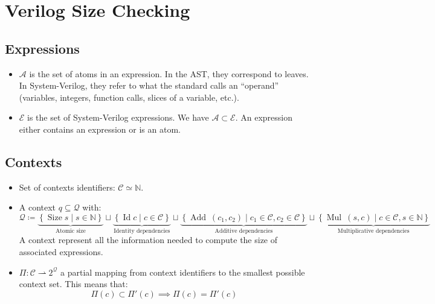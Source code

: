 \documentclass{article}
\DeclareMathOperator{\Size}{Size}
\DeclareMathOperator{\Add}{Add}
\DeclareMathOperator{\Id}{Id}
\DeclareMathOperator{\Mul}{Mul}
\begin{document}
\section*{Verilog Size Checking}


\subsection*{Expressions}

\begin{itemize}
    \item $\mathcal{A}$ is the set of atoms in an expression. In the AST, they correspond to leaves. In System-Verilog, they refer to what the standard calls an ``operand'' (variables, integers, function calls, slices of a variable, etc.).
    \item $\mathcal{E}$ is the set of System-Verilog expressions. We have $\mathcal{A} \subset \mathcal{E}$. An expression either contains an expression or is an atom.
\end{itemize}

\subsection*{Contexts}
\begin{itemize}
    \item Set of contexts identifiers: $\mathcal{C} \simeq \mathbb{N}$.
    \item A context $q \subseteq \mathcal{Q}$ with:
          \begin{equation*}
              \mathcal{Q} \coloneq
              \underbrace{\left\{\Size s \mid s \in \mathbb{N}\right\}}_{\text{Atomic size}}
              \sqcup
              \underbrace{\left\{\Id c \mid c \in \mathcal{C}\right\}}_{\text{Identity dependencies}}
              \sqcup
              \underbrace{\left\{\Add~(c_1, c_2) \mid c_1 \in \mathcal{C}, c_2 \in \mathcal{C}\right\}}_{\text{Additive dependencies}}
              \sqcup
              \underbrace{\left\{\Mul~(s, c) \mid c \in \mathcal{C}, s \in \mathbb{N}\right\}}_{\text{Multiplicative dependencies}}
          \end{equation*}
          A context represent all the information needed to compute the size of associated expressions.

    \item $\Pi: \mathcal{C} \rightharpoonup  2^{\mathcal{Q}}$ a partial mapping from context identifiers to
          the smallest possible context set. This means that:
          \begin{equation*}
              \Pi(c) \subset \Pi'(c) \implies \Pi(c) = \Pi'(c)
          \end{equation*}
\end{itemize}
\end{document}

